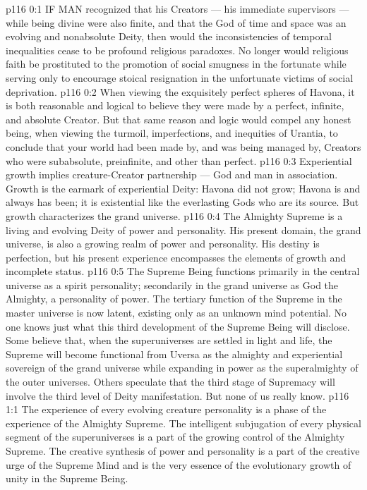 \vs p116 0:1 IF MAN recognized that his Creators --- his immediate supervisors --- while being divine were also finite, and that the God of time and space was an evolving and nonabsolute Deity, then would the inconsistencies of temporal inequalities cease to be profound religious paradoxes. No longer would religious faith be prostituted to the promotion of social smugness in the fortunate while serving only to encourage stoical resignation in the unfortunate victims of social deprivation.
\vs p116 0:2 When viewing the exquisitely perfect spheres of Havona, it is both reasonable and logical to believe they were made by a perfect, infinite, and absolute Creator. But that same reason and logic would compel any honest being, when viewing the turmoil, imperfections, and inequities of Urantia, to conclude that your world had been made by, and was being managed by, Creators who were subabsolute, preinfinite, and other than perfect.
\vs p116 0:3 \pc Experiential growth implies creature\hyp{}Creator partnership --- God and man in association. Growth is the earmark of experiential Deity: Havona did not grow; Havona is and always has been; it is existential like the everlasting Gods who are its source. But growth characterizes the grand universe.
\vs p116 0:4 The Almighty Supreme is a living and evolving Deity of power and personality. His present domain, the grand universe, is also a growing realm of power and personality. His destiny is perfection, but his present experience encompasses the elements of growth and incomplete status.
\vs p116 0:5 \pc The Supreme Being functions primarily in the central universe as a spirit personality; secondarily in the grand universe as God the Almighty, a personality of power. The tertiary function of the Supreme in the master universe is now latent, existing only as an unknown mind potential. No one knows just what this third development of the Supreme Being will disclose. Some believe that, when the superuniverses are settled in light and life, the Supreme will become functional from Uversa as the almighty and experiential sovereign of the grand universe while expanding in power as the superalmighty of the outer universes. Others speculate that the third stage of Supremacy will involve the third level of Deity manifestation. But none of us really know.
\vs p116 1:1 The experience of every evolving creature personality is a phase of the experience of the Almighty Supreme. The intelligent subjugation of every physical segment of the superuniverses is a part of the growing control of the Almighty Supreme. The creative synthesis of power and personality is a part of the creative urge of the Supreme Mind and is the very essence of the evolutionary growth of unity in the Supreme Being.
